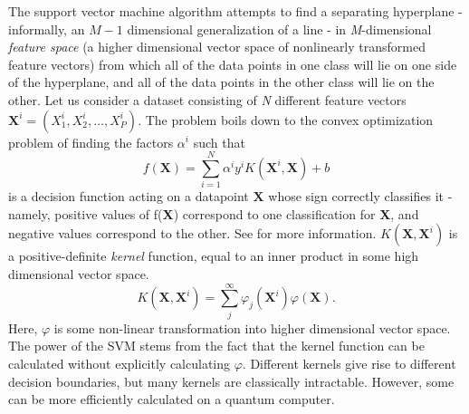 \documentclass[twocolumn, english]{revtex4-2}
\begin{document}
The support vector machine algorithm attempts to find a separating hyperplane - informally, an $\textit{M}-1$ dimensional generalization of a line - in \textit{M}-dimensional \textit{feature space} (a higher dimensional vector space of nonlinearly transformed feature vectors) from which all of the data points in one class will lie on one side of the hyperplane, and all of the data points in the other class will lie on the other. Let us consider a dataset consisting of \textit{N} different feature vectors $\textbf{X}^{i} = (\textit{X}^{i}_{1}, \textit{X}^{i}_{2}, …, \textit{X}^{i}_{P})$. The problem boils down to the convex optimization problem of finding the factors $\alpha^{i}$ such that \begin{equation}f(\textbf{X})=\sum_{i=1}^{N}\alpha^{i}y^{i}K(\textbf{X}^{i}, \textbf{X})+b\end{equation} is a decision function acting on a datapoint $\textbf{X}$ whose sign correctly classifies it - namely, positive values of f(\textbf{X}) correspond to one classification for \textbf{X}, and negative values correspond to the other. See \cite{Smola2004} for more information. $\textit{K}(\textbf{X}, \textbf{X}^{i})$ is a positive-definite \textit{kernel} function, equal to an inner product in some high dimensional vector space. \begin{equation}\textit{K}(\textbf{X}, \textbf{X}^{i})=\sum_{j}^{\infty}\varphi_{j}(\textbf{X}^{i})\varphi(\textbf{X}).\end{equation} Here, $\varphi$ is some non-linear transformation into higher dimensional vector space. The power of the SVM stems from the fact that the kernel function can be calculated without explicitly calculating $\varphi$. Different kernels give rise to different decision boundaries, but many kernels are classically intractable. However, some can be more efficiently calculated on a quantum computer. 
\end{document}
